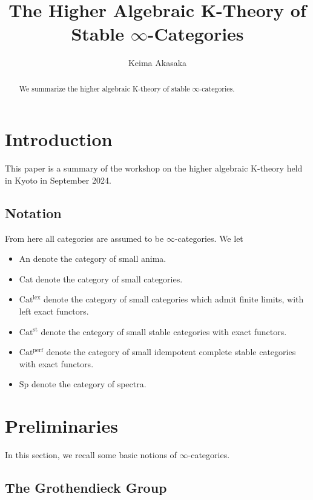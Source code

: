 \documentclass[a4paper,dvipdfmx,11pt,reqno]{amsart}
\newcommand{\An}{\mathrm{An}}
\newcommand{\Cat}{\mathrm{Cat}}
\newcommand{\Catlex}{\mathrm{Cat^{lex}}}
\newcommand{\Catperf}{\mathrm{Cat^{perf}}}
\newcommand{\Catst}{\mathrm{Cat^{st}}}
\newcommand{\Sp}{\mathrm{Sp}}
\theoremstyle{definition}
\begin{document}
\title{The Higher Algebraic K-Theory of Stable \texorpdfstring{$\infty$}{infty}-Categories}
\author{Keima Akasaka}
\maketitle 

\begin{abstract}
  We summarize the higher algebraic K-theory of stable $\infty$-categories.
\end{abstract} 

\setcounter{tocdepth}{1}
\tableofcontents   


\section{Introduction}

This paper is a summary of the workshop on the higher algebraic K-theory held in Kyoto in September 2024.


\subsection{Notation}

From here all categories are assumed to be $\infty$-categories.
We let 
\begin{itemize}
  \item $\An$ denote the category of small anima.
  \item $\Cat$ denote the category of small categories.
  \item $\Catlex$ denote the category of small categories which admit finite limits, with left exact functors.
  \item $\Catst$ denote the category of small stable categories with exact functors.
  \item $\Catperf$ denote the category of small idempotent complete stable categories with exact functors.
  \item $\Sp$ denote the category of spectra.
\end{itemize}


\section{Preliminaries} \label{sec.preliminaries}

In this section, we recall some basic notions of $\infty$-categories.

\subsection{The Grothendieck Group} 
\end{document}
